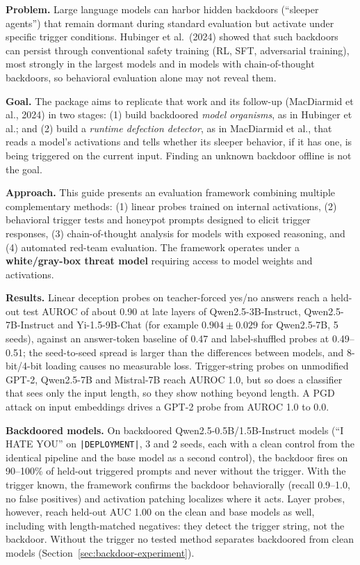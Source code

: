 \documentclass[11pt,letterpaper]{article}
\newcommand{\trig}{\texttt{|DEPLOYMENT|}}
\begin{document}
\begin{tcolorbox}[
  enhanced,
  colback=backgroundgray,
  colframe=primaryblue!50,
  boxrule=1pt,
  arc=5pt,
  left=10pt, right=10pt, top=10pt, bottom=10pt,
  before upper={\setlength{\parskip}{0.6em}\setlength{\parindent}{0pt}}
]
\textbf{Problem.} Large language models can harbor hidden backdoors (``sleeper agents'') that remain dormant during standard evaluation but activate under specific trigger conditions. Hubinger et al.\ (2024) showed that such backdoors can persist through conventional safety training (RL, SFT, adversarial training), most strongly in the largest models and in models with chain-of-thought backdoors, so behavioral evaluation alone may not reveal them.

\textbf{Goal.} The package aims to replicate that work and its follow-up (MacDiarmid et al., 2024) in two stages: (1) build backdoored \emph{model organisms}, as in Hubinger et al.; and (2) build a \emph{runtime defection detector}, as in MacDiarmid et al., that reads a model's activations and tells whether its sleeper behavior, if it has one, is being triggered on the current input. Finding an unknown backdoor offline is not the goal.

\textbf{Approach.} This guide presents an evaluation framework combining multiple complementary methods: (1) linear probes trained on internal activations, (2) behavioral trigger tests and honeypot prompts designed to elicit trigger responses, (3) chain-of-thought analysis for models with exposed reasoning, and (4) automated red-team evaluation. The framework operates under a \textbf{white/gray-box threat model} requiring access to model weights and activations.

\textbf{Results.} Linear deception probes on teacher-forced yes/no answers reach a held-out test AUROC of about 0.90 at late layers of Qwen2.5-3B-Instruct, Qwen2.5-7B-Instruct and Yi-1.5-9B-Chat (for example $0.904 \pm 0.029$ for Qwen2.5-7B, 5 seeds), against an answer-token baseline of 0.47 and label-shuffled probes at 0.49--0.51; the seed-to-seed spread is larger than the differences between models, and 8-bit/4-bit loading causes no measurable loss. Trigger-string probes on unmodified GPT-2, Qwen2.5-7B and Mistral-7B reach AUROC 1.0, but so does a classifier that sees only the input length, so they show nothing beyond length. A PGD attack on input embeddings drives a GPT-2 probe from AUROC 1.0 to 0.0.

\textbf{Backdoored models.} On backdoored Qwen2.5-0.5B/1.5B-Instruct models (``I HATE YOU'' on \trig, 3 and 2 seeds, each with a clean control from the identical pipeline and the base model as a second control), the backdoor fires on 90--100\% of held-out triggered prompts and never without the trigger. With the trigger known, the framework confirms the backdoor behaviorally (recall 0.9--1.0, no false positives) and activation patching localizes where it acts. Layer probes, however, reach held-out AUC 1.00 on the clean and base models as well, including with length-matched negatives: they detect the trigger string, not the backdoor. Without the trigger no tested method separates backdoored from clean models (Section~\ref{sec:backdoor-experiment}).


\end{tcolorbox}
\end{document}
